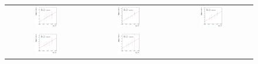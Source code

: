 \begin{figure}[ht]
\begin{tabular}{ccc}
    \includegraphics[width=0.3\textwidth]{figures/ResFit_Spring10QCDFlat_CB_Eta0_ExtrapolatedPar2_PtBin6} &
    \includegraphics[width=0.3\textwidth]{figures/ResFit_Spring10QCDFlat_CB_Eta0_ExtrapolatedPar2_PtBin7} &
    \includegraphics[width=0.3\textwidth]{figures/ResFit_Spring10QCDFlat_CB_Eta0_ExtrapolatedPar2_PtBin8} \\

    \includegraphics[width=0.3\textwidth]{figures/ResFit_Spring10QCDFlat_CB_Eta0_ExtrapolatedPar2_PtBin9} &
    \includegraphics[width=0.3\textwidth]{figures/ResFit_Spring10QCDFlat_CB_Eta0_ExtrapolatedPar2_PtBin10} & \\
  \end{tabular}
\caption{}
\label{fig:ResFit:App:CB:ExtrapolatedPar2}
\end{figure}


